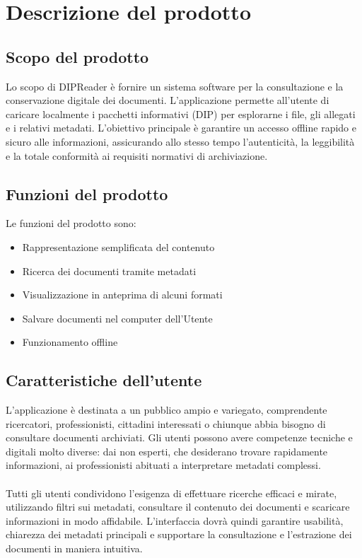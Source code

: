 \documentclass[a4paper,12pt]{article}
\begin{document}
    \newpage
    \section{Descrizione del prodotto} {
        \subsection{Scopo del prodotto} {
            Lo scopo di DIPReader è fornire un sistema software per la consultazione e la conservazione digitale dei documenti. L'applicazione permette all'utente di caricare localmente i pacchetti informativi (DIP) per esplorarne i file, gli allegati e i relativi metadati. L'obiettivo principale è garantire un accesso offline rapido e sicuro alle informazioni, assicurando allo stesso tempo l'autenticità, la leggibilità e la totale conformità ai requisiti normativi di archiviazione. }
        \subsection{Funzioni del prodotto} {
            Le funzioni del prodotto sono: 
            \begin{itemize}
                \item Rappresentazione semplificata del contenuto 
                \item Ricerca dei documenti tramite metadati
                \item Visualizzazione in anteprima di alcuni formati
                \item Salvare documenti nel computer dell'Utente
                \item Funzionamento offline
            \end{itemize}
        }
        \subsection{Caratteristiche dell'utente} {
            L’applicazione è destinata a un pubblico ampio e variegato, comprendente ricercatori, professionisti, cittadini interessati o chiunque abbia bisogno di consultare documenti archiviati. Gli utenti possono avere competenze tecniche e digitali molto diverse: dai non esperti, che desiderano trovare rapidamente informazioni, ai professionisti abituati a interpretare metadati complessi. \\
            \\
            Tutti gli utenti condividono l’esigenza di effettuare ricerche efficaci e mirate, utilizzando filtri sui metadati, consultare il contenuto dei documenti e scaricare informazioni in modo affidabile. L’interfaccia dovrà quindi garantire usabilità, chiarezza dei metadati principali e supportare la consultazione e l’estrazione dei documenti in maniera intuitiva.
        }

    }
    \newpage
\end{document}
